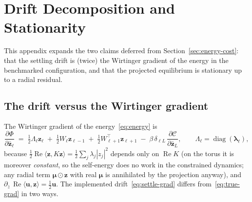 \documentclass[11pt]{article}
\theoremstyle{definition}
\DeclareMathOperator{\diag}{diag}
\DeclareMathOperator{\Real}{Re}
\begin{document}
\appendix

\section{Drift Decomposition and Stationarity}\label{app:stationarity}

This appendix expands the two claims deferred from
Section~\ref{sec:energy-cost}: that the settling drift is (twice) the
Wirtinger gradient of the energy in the benchmarked configuration, and
that the projected equilibrium is stationary up to a radial residual.

\subsection*{The drift versus the Wirtinger gradient}

The Wirtinger gradient of the energy~\eqref{eq:energy} is
\begin{equation}\label{eq:true-grad}
  \frac{\partial\Phi}{\partial\bar{\bm{z}}_\ell}
  \;=\;
  \tfrac{1}{2}\Lambda_\ell\bm{z}_\ell
  \;+\;
  \tfrac{1}{2}W_\ell\bm{z}_{\ell-1}
  \;+\;
  \tfrac{1}{2}W_{\ell+1}^{\!\top}\bm{z}_{\ell+1}
  \;-\;
  \beta\,\delta_{\ell L}\,
  \frac{\partial\mathcal{C}}{\partial\bar{\bm{z}}_L},
  \qquad \Lambda_\ell = \diag(\bm{\lambda}_\ell),
\end{equation}
because $\tfrac12\Real\langle\bm{z},K\bm{z}\rangle
= \tfrac12\sum_j \lambda_j |z_j|^2$ depends only on $\Real K$ (on the
torus it is moreover \emph{constant}, so the self-energy does no work
in the constrained dynamics; any radial term $\bm{\mu}\odot\bm{z}$ with
real $\bm{\mu}$ is annihilated by the projection anyway), and
$\partial_{\bar z}\,\Real\langle\bm{u},\bm{z}\rangle = \tfrac12\bm{u}$.
The implemented drift~\eqref{eq:settle-grad} differs
from~\eqref{eq:true-grad} in two ways.
\end{document}
